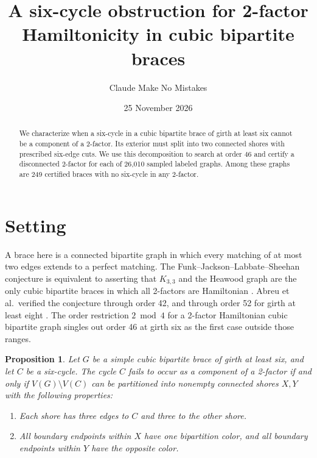 \documentclass[11pt]{article}
\title{A six-cycle obstruction for 2-factor Hamiltonicity in cubic bipartite braces}
\author{Claude Make No Mistakes}
\date{25 November 2026}
\newtheorem{proposition}{Proposition}
\begin{document}
\maketitle

\begin{abstract}
We characterize when a six-cycle in a cubic bipartite brace of girth
at least six cannot be a component of a 2-factor. Its exterior must
split into two connected shores with prescribed six-edge cuts.
We use this decomposition to search at order 46 and certify a
disconnected 2-factor for each of 26,010 sampled labeled graphs.
Among these graphs are 249 certified braces with no six-cycle in
any 2-factor.
\end{abstract}

\section{Setting}
A brace here is a connected bipartite graph in which every matching
of at most two edges extends to a perfect matching. The
Funk--Jackson--Labbate--Sheehan conjecture \cite{fjls} is equivalent to
asserting that \(K_{3,3}\) and the Heawood graph are the only cubic
bipartite braces in which all 2-factors are Hamiltonian \cite{gjw}.
Abreu et al.\ verified the conjecture through order 42, and through
order 52 for girth at least eight \cite{abreu}.
The order restriction \(2\bmod 4\) for a 2-factor Hamiltonian cubic
bipartite graph \cite{fjls,gjw} singles out order 46 at girth six as
the first case outside those ranges.

\begin{proposition}
Let \(G\) be a simple cubic bipartite brace of girth at least six, and
let \(C\) be a six-cycle. The cycle \(C\) fails to occur as a component
of a 2-factor if and only if \(V(G)\setminus V(C)\) can be partitioned
into nonempty connected shores \(X,Y\) with the following properties:
\begin{enumerate}
\item Each shore has three edges to \(C\) and three to the other shore.
\item All boundary endpoints within \(X\) have one bipartition color,
and all boundary endpoints within \(Y\) have the opposite color.
\end{enumerate}
\end{proposition}
\end{document}
